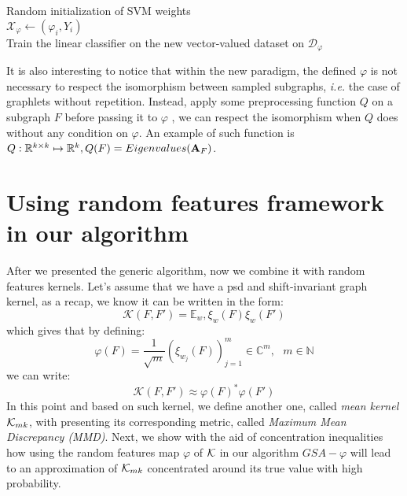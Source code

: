 \begin{algorithm}[H]
\DontPrintSemicolon
  \\
  \\
  \Algo{\\}
  Random initialization of SVM weights\\
  $\mathcal{X}_{\varphi}\gets (\varphi_i,Y_i)$\\
  Train the linear classifier on the new vector-valued dataset on $\mathcal{D}_{\varphi}$
\caption{$GSA-\varphi$}
\end{algorithm}

It is also interesting to notice that within the new paradigm, the defined $\varphi$ is not necessary to respect the isomorphism between sampled subgraphs, \emph{i.e.} the case of graphlets without repetition. Instead, apply some preprocessing function $Q$ on a subgraph $F$ before passing it to $\varphi$ , we can respect the isomorphism  when $Q$ does without any condition on $\varphi$. An example of such function is $Q:\mathbb{R}^{k\times k}\mapsto \mathbb{R}^k, Q(F)=Eigenvalues(\mathbf{A}_F)$.


\section{Using random features framework in our algorithm}
After we presented the generic algorithm, now we combine it with random features kernels.
Let's assume that we have a psd and shift-invariant graph kernel, as a recap, we know it can be written in the form:
\begin{equation}
\mathcal{K}(F,F')= \mathbb{E}_w, \xi_w(F)\xi_w(F')
\end{equation}
which gives that by defining:
\begin{equation}
\varphi(F) = \frac{1}{\sqrt{m}} ( \xi_{w_j}(F) )_{j=1}^m \in \mathbb{C}^m,~~~ m\in \mathbb{N}
\end{equation}
we can write:
\[
\mathcal{K}(F,F')\approx \varphi(F)^*\varphi(F')
\]
In this point and based on such kernel, we define another one, called \emph{mean kernel} $\mathcal{K}_{mk}$, with presenting its corresponding metric, called \emph{Maximum Mean Discrepancy (MMD)}. Next, we show with the aid of concentration inequalities how using the random features map $\varphi$ of $\mathcal{K}$ in  our algorithm $GSA-\varphi$ will lead to an approximation of $\mathcal{K}_{mk}$ concentrated around its true value with high probability.

